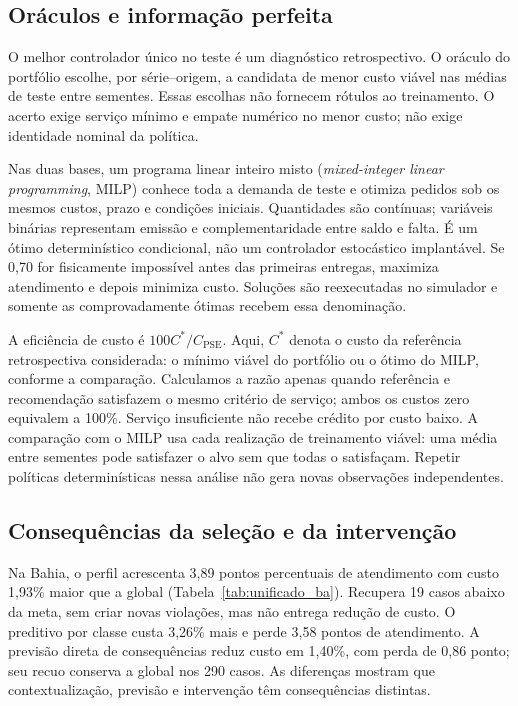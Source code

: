 \documentclass[preprint,12pt]{elsarticle}
\begin{document}
\subsection{Oráculos e informação perfeita}
O melhor controlador único no teste é um diagnóstico retrospectivo. O oráculo do portfólio escolhe, por série--origem, a candidata de menor custo viável nas médias de teste entre sementes. Essas escolhas não fornecem rótulos ao treinamento. O acerto exige serviço mínimo e empate numérico no menor custo; não exige identidade nominal da política.

Nas duas bases, um programa linear inteiro misto (\textit{mixed-integer linear programming}, MILP) conhece toda a demanda de teste e otimiza pedidos sob os mesmos custos, prazo e condições iniciais. Quantidades são contínuas; variáveis binárias representam emissão e complementaridade entre saldo e falta. É um ótimo determinístico condicional, não um controlador estocástico implantável. Se 0,70 for fisicamente impossível antes das primeiras entregas, maximiza atendimento e depois minimiza custo. Soluções são reexecutadas no simulador e somente as comprovadamente ótimas recebem essa denominação.

A eficiência de custo é $100C^*/C_{\mathrm{PSE}}$. Aqui, $C^*$ denota o custo da referência retrospectiva considerada: o mínimo viável do portfólio ou o ótimo do MILP, conforme a comparação. Calculamos a razão apenas quando referência e recomendação satisfazem o mesmo critério de serviço; ambos os custos zero equivalem a 100\%. Serviço insuficiente não recebe crédito por custo baixo. A comparação com o MILP usa cada realização de treinamento viável: uma média entre sementes pode satisfazer o alvo sem que todas o satisfaçam. Repetir políticas determinísticas nessa análise não gera novas observações independentes.


\subsection{Consequências da seleção e da intervenção}
Na Bahia, o perfil acrescenta 3,89 pontos percentuais de atendimento com custo 1,93\% maior que a global (Tabela~\ref{tab:unificado_ba}). Recupera 19 casos abaixo da meta, sem criar novas violações, mas não entrega redução de custo. O preditivo por classe custa 3,26\% mais e perde 3,58 pontos de atendimento. A previsão direta de consequências reduz custo em 1,40\%, com perda de 0,86 ponto; seu recuo conserva a global nos 290 casos. As diferenças mostram que contextualização, previsão e intervenção têm consequências distintas.
\end{document}
